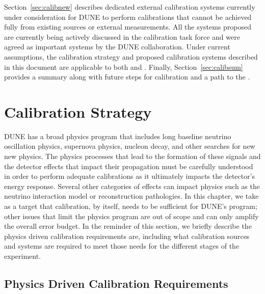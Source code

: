 Section~\ref{sec:calibnew} describes dedicated external calibration systems currently under consideration for DUNE to perform calibrations that cannot be achieved fully from existing sources or external measurements. All the systems proposed are currently being actively discussed in the calibration task force and were agreed as important systems by the DUNE collaboration. Under current assumptions, the calibration strategy and proposed calibration systems described in this document are applicable to both  and . %
Finally, Section~\ref{sec:calibsum} provides a summary along with future steps for calibration and a path to the . 

\section{Calibration Strategy}
\label{sec:calibstrat} %
DUNE has a broad physics program that includes long baseline neutrino oscillation physics, supernova physics, nucleon decay, and other searches for new new physics. The physics processes that lead to the formation of these signals and the detector effects that impact their propagation must be carefully understood in order to perform adequate calibrations as it ultimately impacts the detector's energy response. Several other categories of effects can impact physics such as the neutrino interaction model or reconstruction pathologies. In this chapter, we take as a target that calibration, by itself, needs to be sufficient for DUNE's program; other issues that limit the physics program are out of scope and can only amplify the overall error budget. In the reminder of this section, we briefly describe the physics driven calibration requirements are, including what calibration sources and systems are required to meet those needs for the different stages of the experiment.

\subsection{Physics Driven Calibration Requirements}

